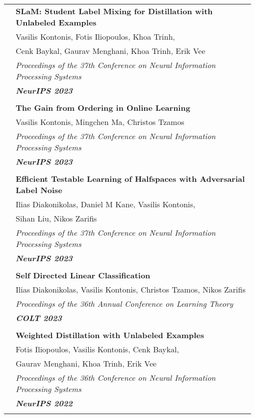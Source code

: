 \documentclass[letterpaper,11pt,oneside]{article}
\begin{document}
\begin{longtable}{@{} l l}
 &\textbf{SLaM: Student Label Mixing for Distillation with Unlabeled Examples}\\
 & Vasilis Kontonis, Fotis Iliopoulos,  Khoa Trinh,\\
 & Cenk Baykal, Gaurav Menghani, Khoa Trinh, Erik Vee\\ 
 & \emph{Proceedings of the 37th Conference on Neural Information Processing Systems} \\
 & \emph{\textbf{NeurIPS 2023}} \\
 & \\

 &\textbf{The Gain from Ordering in Online Learning}\\
 & Vasilis Kontonis, Mingchen Ma, Christos Tzamos\\
 & \emph{Proceedings of the 37th Conference on Neural Information Processing Systems} \\
 & \emph{\textbf{NeurIPS 2023}} \\
 & \\

 &\textbf{Efficient Testable Learning of Halfspaces with Adversarial Label Noise}\\
 & Ilias Diakonikolas, Daniel M Kane, Vasilis Kontonis, \\
 & Sihan Liu, Nikos Zarifis\\
 & \emph{Proceedings of the 37th Conference on Neural Information Processing Systems} \\
 & \emph{\textbf{NeurIPS 2023}} \\
 & \\


 &\textbf{Self Directed Linear Classification}\\
 & Ilias Diakonikolas, Vasilis Kontonis, Christos Tzamos, Nikos Zarifis \\
 & \emph{Proceedings of the 36th Annual Conference on Learning Theory}\\
 & \emph{\textbf{COLT 2023}} \\
 & \\

 &\textbf{Weighted Distillation with Unlabeled Examples}\\
 & Fotis Iliopoulos, Vasilis Kontonis, Cenk Baykal,\\
 & Gaurav Menghani, Khoa Trinh, Erik Vee\\ 
& \emph{Proceedings of the 36th Conference on Neural Information Processing Systems} \\
& \emph{\textbf{NeurIPS 2022}} \\
 & \\


\end{longtable}
\end{document}
